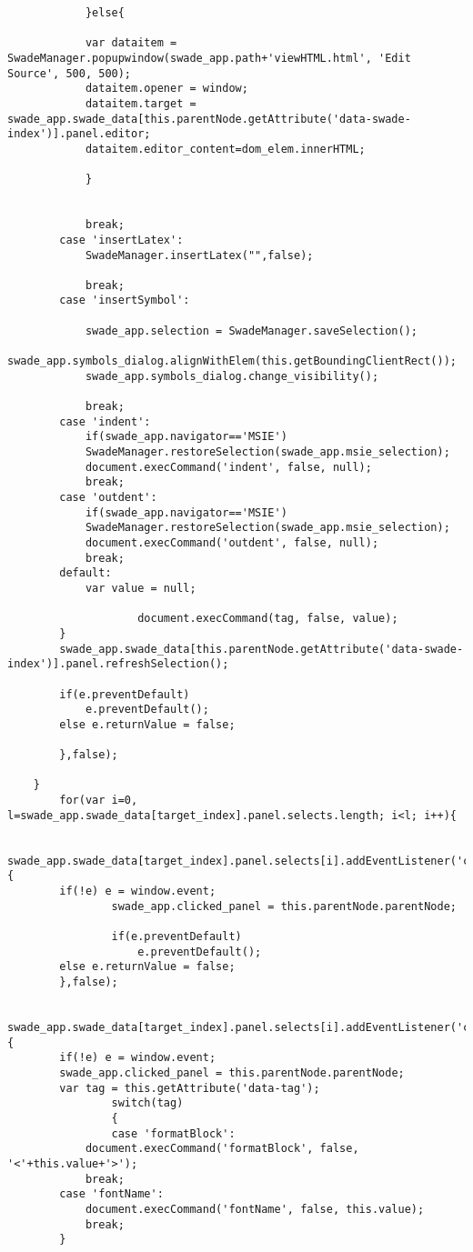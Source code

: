 \begin{lstlisting}
		    }else{

			var dataitem = SwadeManager.popupwindow(swade_app.path+'viewHTML.html', 'Edit Source', 500, 500);
			dataitem.opener = window;
			dataitem.target = swade_app.swade_data[this.parentNode.getAttribute('data-swade-index')].panel.editor;
			dataitem.editor_content=dom_elem.innerHTML;

		    }

		    
		    break;
		case 'insertLatex':
		    SwadeManager.insertLatex("",false);

		    break;
		case 'insertSymbol':

		    swade_app.selection = SwadeManager.saveSelection();
		    swade_app.symbols_dialog.alignWithElem(this.getBoundingClientRect());
		    swade_app.symbols_dialog.change_visibility();  

		    break;
		case 'indent':
		    if(swade_app.navigator=='MSIE')
			SwadeManager.restoreSelection(swade_app.msie_selection);
		    document.execCommand('indent', false, null);
		    break;
		case 'outdent':
		    if(swade_app.navigator=='MSIE')
			SwadeManager.restoreSelection(swade_app.msie_selection);
		    document.execCommand('outdent', false, null);
		    break;
		default:
		    var value = null;

                    document.execCommand(tag, false, value);
		}
		swade_app.swade_data[this.parentNode.getAttribute('data-swade-index')].panel.refreshSelection();
		
		if(e.preventDefault)
		    e.preventDefault();
		else e.returnValue = false;
		
	    },false);

	}
        for(var i=0, l=swade_app.swade_data[target_index].panel.selects.length; i<l; i++){

            swade_app.swade_data[target_index].panel.selects[i].addEventListener('click',function(e){
		if(!e) e = window.event;
                swade_app.clicked_panel = this.parentNode.parentNode;
                
                if(e.preventDefault)
                    e.preventDefault();
		else e.returnValue = false;
	    },false);
            
            swade_app.swade_data[target_index].panel.selects[i].addEventListener('change',function(e){
		if(!e) e = window.event;
		swade_app.clicked_panel = this.parentNode.parentNode;
		var tag = this.getAttribute('data-tag');
                switch(tag)
                {
                case 'formatBlock':
		    document.execCommand('formatBlock', false, '<'+this.value+'>');
		    break;
		case 'fontName':
		    document.execCommand('fontName', false, this.value);
		    break;
		}
                

\end{lstlisting}
